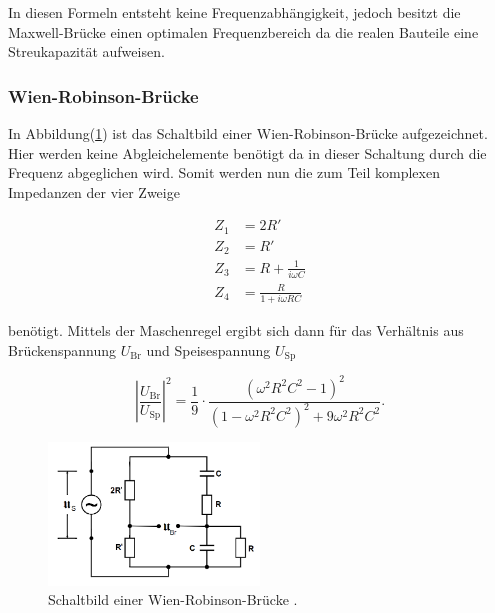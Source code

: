             \noindent In diesen Formeln entsteht keine Frequenzabhängigkeit, jedoch besitzt die Maxwell-Brücke einen optimalen Frequenzbereich 
            da die realen Bauteile eine Streukapazität aufweisen. 

        \subsubsection{Wien-Robinson-Brücke}

            \noindent In Abbildung(\ref{img:Wien}) ist das Schaltbild einer Wien-Robinson-Brücke aufgezeichnet. Hier werden keine 
            Abgleichelemente benötigt da in dieser Schaltung durch die Frequenz abgeglichen wird. Somit werden nun die zum Teil 
            komplexen Impedanzen der vier Zweige 

            \begin{align*}
                Z_1 &= 2R' \\
                Z_2 &= R'\\
                Z_3 &= R + \frac{1}{ i \omega C}\\
                Z_4 &= \frac{R}{1 + i \omega R C}
            \end{align*}

            \noindent benötigt. Mittels der Maschenregel ergibt sich dann für das Verhältnis aus Brückenspannung $U_{\text{Br}}$ 
            und Speisespannung $U_{\text{Sp}}$ 

            \begin{equation*}
                \left|  \frac{U_{\text{Br}}}{U_{\text{Sp}}} \right|^2 = \frac{1}{9} 
                \cdot \frac{\left(\omega^2 R^2 C^2 - 1\right)^2}{\left(1 - \omega^2 R^2 C^2\right)^2 + 9 \omega^2 R^2 C^2} .
            \end{equation*}

            \begin{figure}[ht]
                \centering
                \includegraphics[width=0.5\textwidth]{latex/images/Wien.PNG}
                \caption{Schaltbild einer Wien-Robinson-Brücke \protect \cite{V302}.}
                \label{img:Wien}
            \end{figure}

